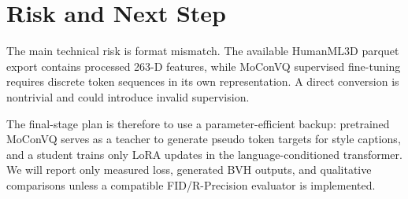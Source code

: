 \documentclass[conference]{IEEEtran}
\begin{document}
\section{Risk and Next Step}
The main technical risk is format mismatch. The available HumanML3D parquet export contains processed 263-D features, while MoConVQ supervised fine-tuning requires discrete token sequences in its own representation. A direct conversion is nontrivial and could introduce invalid supervision.

The final-stage plan is therefore to use a parameter-efficient backup: pretrained MoConVQ serves as a teacher to generate pseudo token targets for style captions, and a student trains only LoRA updates in the language-conditioned transformer. We will report only measured loss, generated BVH outputs, and qualitative comparisons unless a compatible FID/R-Precision evaluator is implemented.



\end{document}
